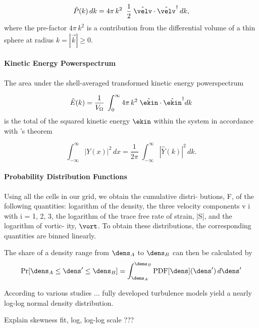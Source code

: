 \begin{equation}
    \tilde{P}(k)\,dk = 4 \pi\,k^2 \;\; \frac{1}{2} \; \hat{\velv} \cdot \hat{\velv}^{\dagger}\,dk,
\end{equation}
where the pre-factor $4 \pi\,k^2$ is a contribution from the differential
volume of a thin sphere at radius $k = |\vec{k}| \ge 0$.

\paragraph{Kinetic Energy Powerspectrum}
The area under the shell-averaged transformed kinetic energy powerspectrum

\begin{equation}
    \tilde{E}(k) = \frac{1}{V_{\Omega}} \; \int_0^\infty 4\pi\,k^2 \; \hat{\ekin} \cdot \hat{\ekin}^{\dagger} dk
\end{equation}
is the total of the squared kinetic energy $\ekin$ within the system in accordance
with 's theorem

\begin{equation}
    \int_{-\infty}^{\infty} |Y(x)|^2 \, dx = \frac{1}{2\pi} \; \int_{-\infty}^{\infty} |\hat{Y}(k)|^2 \,dk.
\end{equation}

\paragraph{Probability Distribution Functions}

Using all the cells in our grid, we obtain the cumulative distri-
butions, F, of the following quantities: logarithm of the density,
the three velocity components v i with i = 1, 2, 3, the logarithm
of the trace free rate of strain, |S|, and the logarithm of vortic-
ity, $\vort$. To obtain these distributions, the corresponding
quantities are binned linearly.


The share of a density range from $\dens_A$ to $\dens_B$ can then be calculated by
\begin{equation}
    \text{Pr}[\dens_A \le \dens' \le \dens_B] = \int_{\dens_A}^{\dens_B} \text{PDF}[\dens](\dens') \, d\dens'
\end{equation}

According to various studies ... fully developed turbulence models
yield a nearly log-log normal density distribution.

Explain skewness fit, log, log-log scale ???
